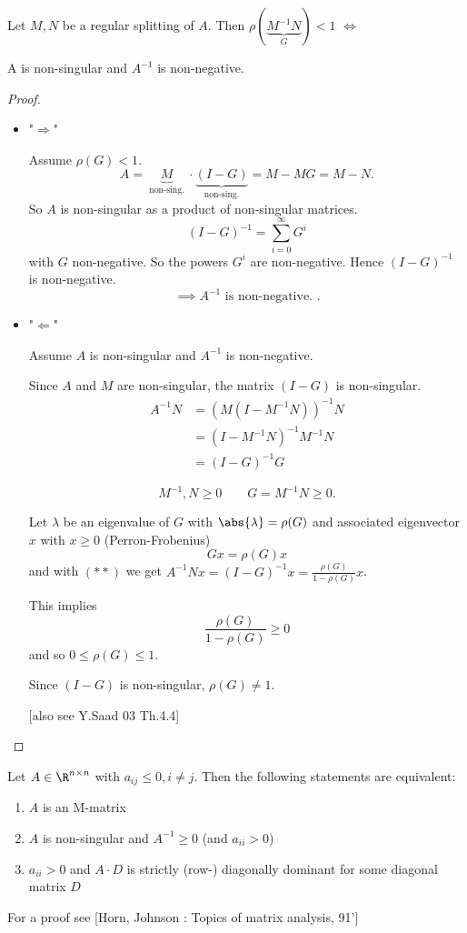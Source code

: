 \begin{theorem}
\label{thm:regularsplittingtheorem}
Let $M,N$ be a regular splitting of $A$. Then $\rho(\underbrace{M^{-1}N}_{G} ) < 1$ $\iff$

A is non-singular and $A^{-1}$ is non-negative.
\end{theorem}

\begin{proof}\
\label{thm:regularsplittingtheoremproof}
\begin{itemize}
	\item "$\Longrightarrow$"

		Assume $\rho(G) < 1$. 
		\[
			A = \underbrace{M}_{\text{ non-sing. }}\cdot \underbrace{(I-G)}_{\text{ non-sing. }} = M -MG = M-N
		.\] 
		So $A$ is non-singular as a product of non-singular matrices.
		\[
			(I-G)^{-1} = \sum_{i=0}^{\infty}{G^{i}}
		\] 
		with $G$ non-negative. So the powers $G^{i}$ are non-negative. Hence $(I-G)^{-1}$ is non-negative.
		\[
		\implies A^{-1} \text{ is non-negative. }
		.\] 
	\item "$\Longleftarrow$"

		Assume $A$ is non-singular and $A^{-1}$ is non-negative.

		Since $A$ and $M$ are non-singular, the matrix $(I-G)$ is non-singular.
		\begin{align*}
			A^{-1}N &= (M(I-M^{-1}N))^{-1}N \\
					&= (I-M^{-1}N)^{-1}M^{-1}N \\
					\tag{$\ast\ast$}
					&= (I-G)^{-1}G
		\end{align*}

		\[
		M^{-1}, N \geq 0 \qquad G = M^{-1}N \geq 0
		.\] 

		Let $\lambda $ be an eigenvalue of $G$ with $\abs{\lambda }=\rho(G)$ and associated eigenvector $x$ with $x \geq 0$ (Perron-Frobenius)
		\[
			Gx = \rho(G)x
		\] 
		and with $(\ast\ast)$ we get $A^{-1}Nx = (I-G)^{-1}x = \frac{\rho(G)}{1 - \rho(G)}x$.

		This implies
		\[
			\frac{\rho(G)}{1-\rho(G)} \geq 0
		\] 
		and so $0 \leq \rho(G) \leq 1$.

		Since $(I-G)$ is non-singular, $\rho(G) \neq 1$.

		[also see Y.Saad 03 Th.4.4]
\end{itemize}
\end{proof}

\begin{lemma}
\label{thm:matrixequivalences}
	Let $A \in \R^{n \times n}$ with $a_{ij} \leq 0, i \neq j$. Then the following statements are equivalent:
	\begin{enumerate}[label=\arabic{enumi})]
		\item $A$ is an M-matrix
		\item $A$ is non-singular and $A^{-1} \geq 0$ (and $a_{ii} > 0$)
		\item $a_{ii} > 0$ and $A\cdot D$ is strictly (row-) diagonally dominant for some diagonal matrix $D$
	\end{enumerate}
	
	For a proof see [Horn, Johnson : Topics of matrix analysis, 91']
\end{lemma}

